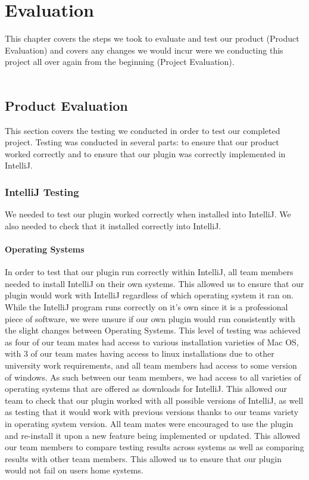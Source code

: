 \chapter{Evaluation}
This chapter covers the steps we took to evaluate and test our product (Product Evaluation) and covers any changes we would incur were we conducting this project all over again from the beginning (Project Evaluation).\\
\\
\section{Product Evaluation}
This section covers the testing we conducted in order to test our completed project. Testing was conducted in several parts: to ensure that our product worked correctly and to ensure that our plugin was correctly implemented in IntelliJ.

\subsection{IntelliJ Testing}
We needed to test our plugin worked correctly when installed into IntelliJ. We also needed to check that it installed correctly into IntelliJ. \\

\subsubsection{Operating Systems}
In order to test that our plugin run correctly within IntelliJ, all team members needed to install IntelliJ on their own systems. This allowed us to ensure that our plugin would work with IntelliJ regardless of which operating system it ran on. While the IntelliJ program runs correctly on it's own since it is a professional piece of software, we were unsure if our own plugin would run consistently with the slight changes between Operating Systems. This level of testing was achieved as four of our team mates had access to various installation varieties of Mac OS, with 3 of our team mates having access to linux installations due to other university work requirements, and all team members had access to some version of windows. As such between our team members, we had access to all varieties of operating systems that are offered as downloads for IntelliJ. This allowed our team to check that our plugin worked with all possible versions of IntelliJ, as well as testing that it would work with previous versions thanks to our teams variety in operating system version. All team mates were encouraged to use the plugin and re-install it upon a new feature being implemented or updated. This allowed our team members to compare testing results across systems as well as comparing results with other team members. This allowed us to ensure that our plugin would not fail on users home systems.\\
\\
